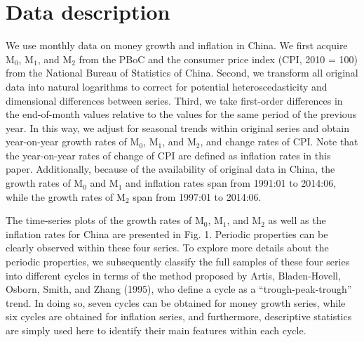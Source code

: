 \documentclass[a4paper,fleqn]{cas-sc}
\begin{document}
\section{Data description}\label{sec:4}
We use monthly data on money growth and inflation in China. We first acquire M$_0$, M$_1$, and M$_2$ from the PBoC and the consumer price index (CPI, 2010 = 100) from the National Bureau of Statistics of China. Second, we transform all original data into natural logarithms to correct for potential heteroscedasticity and dimensional differences between series. Third, we take first-order differences in the end-of-month values relative to the values for the same period of the previous year. In this way, we adjust for seasonal trends within original series and obtain year-on-year growth rates of M$_0$, M$_1$, and M$_2$, and change rates of CPI. Note that the year-on-year rates of change of CPI are defined as inflation rates in this paper. Additionally, because of the availability of original data in China, the growth rates of M$_0$ and M$_1$ and inflation rates span from 1991:01 to 2014:06, while the growth rates of M$_2$ span from 1997:01 to 2014:06.

The time-series plots of the growth rates of M$_0$, M$_1$, and M$_2$ as well as the inflation rates for China are presented in Fig. 1. Periodic properties can be clearly observed within these four series. To explore more details about the periodic properties, we subsequently classify the full samples of these four series into different cycles in terms of the method proposed by Artis, Bladen-Hovell, Osborn, Smith, and Zhang (1995), who define a cycle as a “trough-peak-trough” trend. In doing so, seven cycles can be obtained for money growth series, while six cycles are obtained for inflation series, and furthermore, descriptive statistics are simply used here to identify their main features within each cycle.
\end{document}
